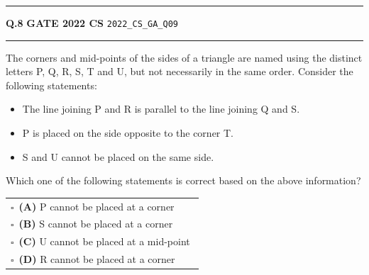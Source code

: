 \documentclass[a4paper,10pt]{article}
\begin{document}
\vspace{6pt}\hrule height 0.35pt\vspace{6pt}
\noindent
\begin{tcolorbox}[
    blanker,
    sidebyside,
    sidebyside align=top,
    lefthand width=0.55\textwidth,
    top=4pt, bottom=4pt, left=0pt, right=0pt,
    middle=16pt,
    underlay={
        \draw[dashed, black!80, line width=0.8pt, dash pattern=on 4pt off 3pt]
            ([xshift=0.55\textwidth+8pt]frame.north west) --
            ([xshift=0.55\textwidth+8pt]frame.south west);
    }
]
\textbf{Q.8}  \hfill {\footnotesize\textbf{GATE 2022 CS} \quad \tiny\texttt{2022\_CS\_GA\_Q09}}
\vspace{2pt}\hrule height 0.3pt\vspace{4pt}

The corners and mid-points of the sides of a triangle are named using the distinct letters P, Q, R, S, T and U, but not necessarily in the same order. Consider the following statements:
\begin{itemize}[itemsep=0pt,topsep=2pt]
\item The line joining P and R is parallel to the line joining Q and S.
\item P is placed on the side opposite to the corner T.
\item S and U cannot be placed on the same side.
\end{itemize}
Which one of the following statements is correct based on the above information?

\par\vspace{6pt}\noindent
\begin{tabular}{@{}p{0.98\linewidth}@{}}
$\square$\ \textbf{(A)} P cannot be placed at a corner \\
\addlinespace[3pt]
$\square$\ \textbf{(B)} S cannot be placed at a corner \\
\addlinespace[3pt]
$\square$\ \textbf{(C)} U cannot be placed at a mid-point \\
\addlinespace[3pt]
$\square$\ \textbf{(D)} R cannot be placed at a corner
\end{tabular}

\tcblower


\end{tcolorbox}
\end{document}

